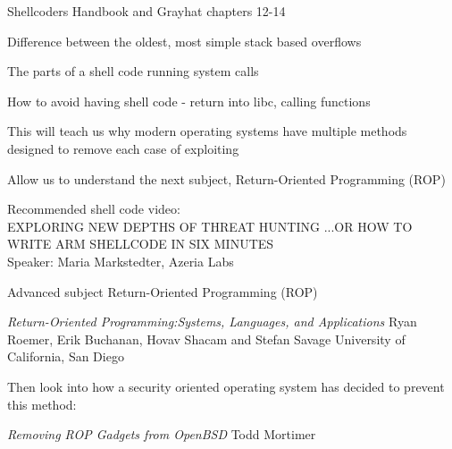 \documentclass[Screen16to9,17pt]{foils}
\begin{document}
\myquestionspage




\begin{list1}
\item Shellcoders Handbook  and Grayhat chapters 12-14
\item Difference between the oldest, most simple stack based overflows
\item The parts of a shell code running system calls
\item How to avoid having shell code - return into libc, calling functions
\item This will teach us why modern operating systems have multiple methods designed to remove each case of exploiting
\item Allow us to understand the next subject, Return-Oriented Programming (ROP)
\end{list1}

Recommended shell code video:\\
EXPLORING NEW DEPTHS OF THREAT HUNTING ...OR HOW TO WRITE ARM SHELLCODE IN SIX MINUTES\\
Speaker: Maria Markstedter, Azeria Labs\\



\begin{list1}
\item Advanced subject Return-Oriented Programming (ROP)
\item \emph{Return-Oriented Programming:Systems, Languages, and Applications}
Ryan Roemer, Erik Buchanan, Hovav Shacam and Stefan Savage University of California, San Diego\\
\item Then look into how a security oriented operating system has decided to prevent this method:
\item \emph{Removing ROP Gadgets from OpenBSD}
Todd Mortimer\\
\end{list1}

\end{document}
